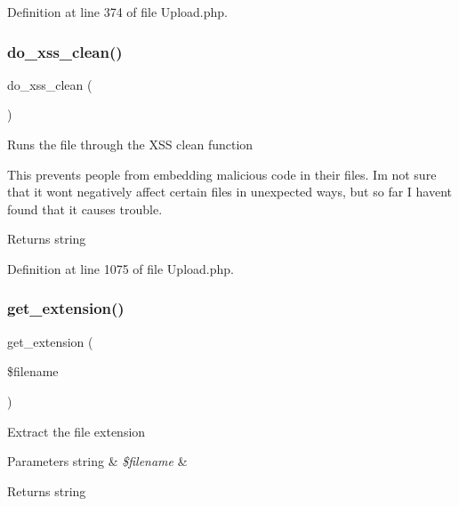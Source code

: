 Definition at line 374 of file Upload.\+php.

\mbox{\label{class_c_i___upload_ae7e5f9b6d774795da126647f10c3c2a6}} 
\subsubsection{\texorpdfstring{do\_xss\_clean()}{do\_xss\_clean()}}
{\footnotesize\ttfamily do\+\_\+xss\+\_\+clean (\begin{DoxyParamCaption}{ }\end{DoxyParamCaption})}

Runs the file through the X\+SS clean function

This prevents people from embedding malicious code in their files. I\textquotesingle{}m not sure that it won\textquotesingle{}t negatively affect certain files in unexpected ways, but so far I haven\textquotesingle{}t found that it causes trouble.

\begin{DoxyReturn}{Returns}
string 
\end{DoxyReturn}


Definition at line 1075 of file Upload.\+php.

\mbox{\label{class_c_i___upload_a6c656eedccb1131accc8e350bc50632f}} 
\subsubsection{\texorpdfstring{get\_extension()}{get\_extension()}}
{\footnotesize\ttfamily get\+\_\+extension (\begin{DoxyParamCaption}\item[{}]{\$filename }\end{DoxyParamCaption})}

Extract the file extension


\begin{DoxyParams}[1]{Parameters}
string & {\em \$filename} & \\
\hline
\end{DoxyParams}
\begin{DoxyReturn}{Returns}
string 
\end{DoxyReturn}


